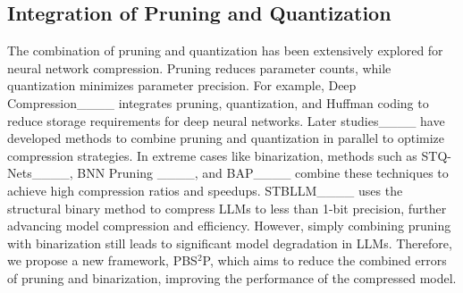 \subsection{Integration of Pruning and Quantization}
The combination of pruning and quantization has been extensively explored for neural network compression. Pruning reduces parameter counts, while quantization minimizes parameter precision. For example, Deep Compression____ integrates pruning, quantization, and Huffman coding to reduce storage requirements for deep neural networks. Later studies____ have developed methods to combine pruning and quantization in parallel to optimize compression strategies. In extreme cases like binarization, methods such as STQ-Nets____, BNN Pruning ____, and BAP____ combine these techniques to achieve high compression ratios and speedups. STBLLM____ uses the structural binary method to compress LLMs to less than 1-bit precision, further advancing model compression and efficiency. However, simply combining pruning with binarization still leads to significant model degradation in LLMs. Therefore, we propose a new framework, PBS$^2$P, which aims to reduce the combined errors of pruning and binarization, improving the performance of the compressed model.
\vspace{-1mm}